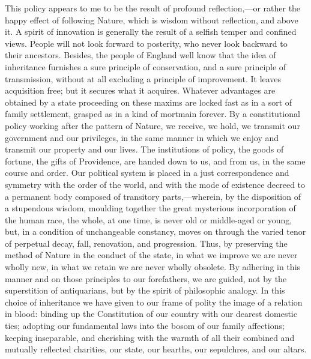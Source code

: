 This policy appears to me to be the result of profound reflection,—or rather the happy effect of following Nature, which is wisdom without reflection, and above it. A spirit of innovation is generally the result of a selfish temper and confined views. People will not look forward to posterity, who never look backward to their ancestors. Besides, the people of England well know that the idea of inheritance furnishes a sure principle of conservation, and a sure principle of transmission, without at all excluding a principle of improvement. It leaves acquisition free; but it secures what it acquires. Whatever advantages are obtained by a state proceeding on these maxims are locked fast as in a sort of family settlement, grasped as in a kind of mortmain forever. By a constitutional policy working after the pattern of Nature, we receive, we hold, we transmit our government and our privileges, in the same manner in which we enjoy and transmit our property and our lives. The institutions of policy, the goods of fortune, the gifts of Providence, are handed down to us, and from us, in the same course and order. Our political system is placed in a just correspondence and symmetry with the order of the world, and with the mode of existence decreed to a permanent body composed of transitory parts,—wherein, by the disposition of a stupendous wisdom, moulding together the great mysterious incorporation of the human race, the whole, at one time, is never old or middle-aged or young, but, in a condition of unchangeable constancy, moves on through the varied tenor of perpetual decay, fall, renovation, and progression. Thus, by preserving the method of Nature in the conduct of the state, in what we improve we are never wholly new, in what we retain we are never wholly obsolete. By adhering in this manner and on those principles to our forefathers, we are guided, not by the superstition of antiquarians, but by the spirit of philosophic analogy. In this choice of inheritance we have given to our frame of polity the image of a relation in blood: binding up the Constitution of our country with our dearest domestic ties; adopting our fundamental laws into the bosom of our family affections; keeping inseparable, and cherishing with the warmth of all their combined and mutually reflected charities, our state, our hearths, our sepulchres, and our altars.

